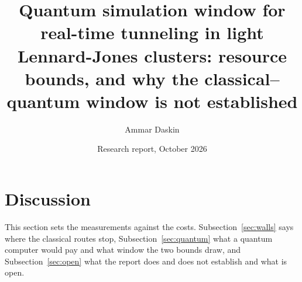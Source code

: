\documentclass[10pt]{article}
\title{\textbf{Quantum simulation window for real-time tunneling in light Lennard-Jones clusters:
resource bounds, and why the classical--quantum window is not established}}
\author{Ammar Daskin}
\date{Research report, October 2026}
\theoremstyle{plain}
\theoremstyle{definition}
\theoremstyle{remark}
\begin{document}
\maketitle
\thispagestyle{empty}

\clearpage
\setcounter{page}{1}






\section{Discussion}
\label{sec:discussion}

This section sets the measurements against the costs. Subsection~\ref{sec:walls} says where the classical routes stop, Subsection~\ref{sec:quantum} what a quantum computer would pay and what window the two bounds draw, and Subsection~\ref{sec:open} what the report does and does not establish and what is open.





\FloatBarrier
\clearpage
\appendix




\end{document}
